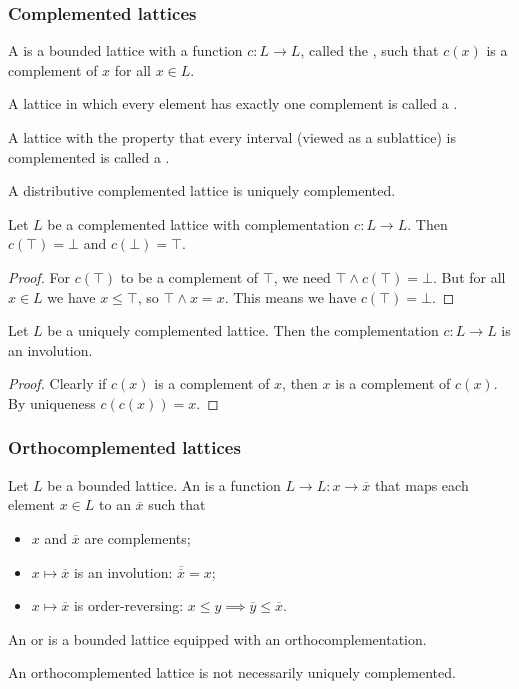\subsubsection{Complemented lattices}
\begin{definition}
A  is a bounded lattice with a function $c:L\to L$, called the , such that $c(x)$ is a complement of $x$ for all $x\in L$.

A lattice in which every element has exactly one complement is called a .

A lattice with the property that every interval (viewed as a sublattice) is complemented is called a .
\end{definition}
A distributive complemented lattice is uniquely complemented.

\begin{lemma}
Let $L$ be a complemented lattice with complementation $c:L\to L$. Then $c(\top) = \bot$ and $c(\bot) = \top$.
\end{lemma}
\begin{proof}
For $c(\top)$ to be a complement of $\top$, we need $\top \wedge c(\top) = \bot$. But for all $x\in L$ we have $x\leq \top$, so $\top\wedge x = x$. This means we have $c(\top) = \bot$.
\end{proof}

\begin{lemma} \label{uniqueComplementInvolution}
Let $L$ be a uniquely complemented lattice. Then the complementation $c:L\to L$ is an involution.
\end{lemma}
\begin{proof}
Clearly if $c(x)$ is a complement of $x$, then $x$ is a complement of $c(x)$. By uniqueness $c(c(x)) = x$.
\end{proof}

\subsubsection{Orthocomplemented lattices}
\begin{definition}
Let $L$ be a bounded lattice. An  is a function $L \to L: x \to \overline{x}$ that maps each element $x\in L$ to an  $\overline{x}$ such that
\begin{itemize}
\item $x$ and $\overline{x}$ are complements;
\item $x\mapsto \overline{x}$ is an involution: $\overline{\overline{x}} = x$;
\item $x\mapsto \overline{x}$ is order-reversing: $x\leq y \implies \overline{y} \leq \overline{x}$.
\end{itemize}
An  or  is a bounded lattice equipped with an orthocomplementation.
\end{definition}
An orthocomplemented lattice is not necessarily uniquely complemented.

